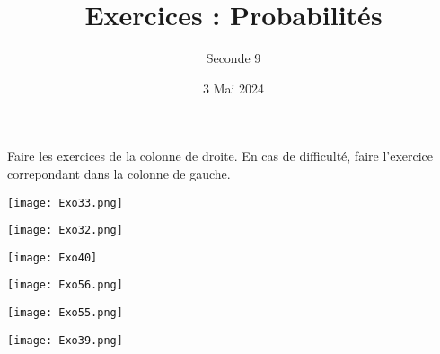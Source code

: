 \documentclass{exam}
\title{Exercices : Probabilités}
\date{3 Mai 2024}
\author{Seconde 9}
\begin{document}
\maketitle
\begin{tcolorbox}
Faire les exercices de la colonne de droite. En cas de difficulté, faire l'exercice correpondant dans la colonne de gauche.
\end{tcolorbox}
\begin{minipage}{0.45\textwidth}
\texttt{[image: Exo33.png]}
\vspace*{0.25cm}

\texttt{[image: Exo32.png]}
\vspace*{1.7cm}

\texttt{[image: Exo40]}
\end{minipage}
\hfill\vline\hfill
\begin{minipage}{0.45\textwidth}
\texttt{[image: Exo56.png]}
\vspace*{0.25cm}

\texttt{[image: Exo55.png]}
\vspace*{0.25cm}

\texttt{[image: Exo39.png]}
\end{minipage}
\end{document}
